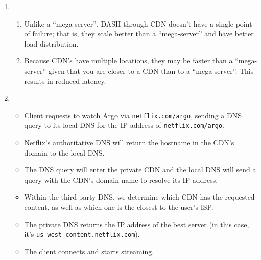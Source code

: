 \documentclass{report}
\begin{document}
\begin{problem}
\begin{answer}{40em}
\begin{enumerate}[label=(\alph*)]
  \item
    \begin{enumerate}[label=\textit{(\roman*)}]
    \item Unlike a ``mega-server'', DASH through CDN doesn't have a single point of failure; that
      is, they scale better than a ``mega-server'' and have better load distribution.
    \item Because CDN's have multiple locations, they may be faster than a ``mega-server'' given
      that you are closer to a CDN than to a ``mega-server''. This results in reduced latency.
    \end{enumerate}
  \item
    \begin{itemize}
    \item Client requests to watch Argo via \texttt{netflix.com/argo}, sending a DNS query to its
      local DNS for the IP address of \texttt{netflix.com/argo}.
    \item Netflix's authoritative DNS will return the hostname in the CDN's domain to the local DNS.
    \item The DNS query will enter the private CDN and the local DNS will send a query with the
      CDN's domain name to resolve its IP address.
    \item Within the third party DNS, we determine which CDN has the requested content, as well as
      which one is the closest to the user's ISP. 
    \item The private DNS returns the IP address of the best server (in this case, it's
      \texttt{us-west-content.netflix.com}).
    \item The client connects and starts streaming.
    \end{itemize}
\end{enumerate}

\end{answer}
\end{problem}
\end{document}
